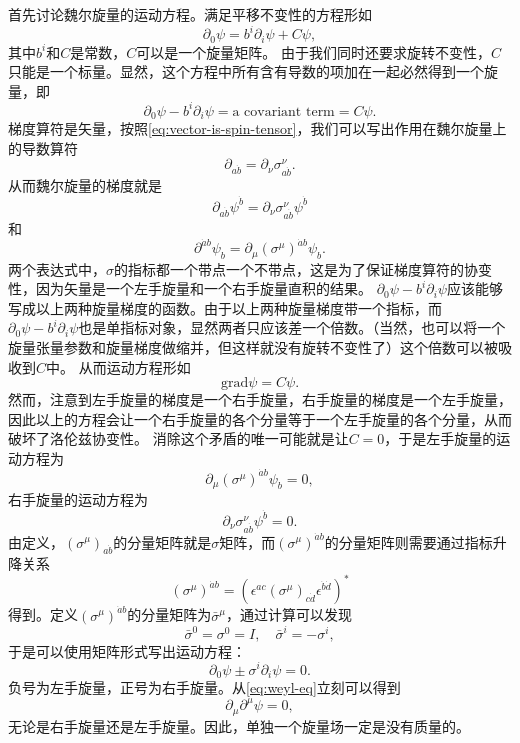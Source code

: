 \documentclass[hyperref, UTF8, a4paper]{ctexart}
\begin{document}
首先讨论魏尔旋量的运动方程。满足平移不变性的方程形如
\[
    \partial_0 \psi = b^i \partial_i \psi + C \psi,
\]
其中$b^i$和$C$是常数，$C$可以是一个旋量矩阵。
由于我们同时还要求旋转不变性，$C$只能是一个标量。显然，这个方程中所有含有导数的项加在一起必然得到一个旋量，即
\[
    \partial_0 \psi - b^i \partial_i \psi = \text{a covariant term} = C \psi.
\]
梯度算符是矢量，按照\eqref{eq:vector-is-spin-tensor}，我们可以写出作用在魏尔旋量上的导数算符
\begin{equation}
    \partial_{a \dot{b}} = \partial_\nu \sigma^\nu_{a \dot{b}}.
\end{equation}
从而魏尔旋量的梯度就是
\[
    \partial_{a \dot{b}} \psi^{\dot{b}} = \partial_\nu \sigma^\nu_{a \dot{b}} \psi^{\dot{b}}
\]
和
\[
    \partial^{\dot{a} b} \psi_b = \partial_\mu (\sigma^\mu)^{\dot{a} b} \psi_b.
\]
两个表达式中，$\sigma$的指标都一个带点一个不带点，这是为了保证梯度算符的协变性，因为矢量是一个左手旋量和一个右手旋量直积的结果。
$\partial_0 \psi - b^i \partial_i \psi$应该能够写成以上两种旋量梯度的函数。由于以上两种旋量梯度带一个指标，而$\partial_0 \psi - b^i \partial_i \psi$也是单指标对象，显然两者只应该差一个倍数。（当然，也可以将一个旋量张量参数和旋量梯度做缩并，但这样就没有旋转不变性了）这个倍数可以被吸收到$C$中。
从而运动方程形如
\[
    \mathrm{grad} \psi = C \psi.
\]
然而，注意到左手旋量的梯度是一个右手旋量，右手旋量的梯度是一个左手旋量，因此以上的方程会让一个右手旋量的各个分量等于一个左手旋量的各个分量，从而破坏了洛伦兹协变性。
消除这个矛盾的唯一可能就是让$C=0$，于是左手旋量的运动方程为
\[
    \partial_\mu (\sigma^\mu)^{\dot{a} b} \psi_b = 0,
\]
右手旋量的运动方程为
\[
    \partial_\nu \sigma^\nu_{a \dot{b}} \psi^{\dot{b}} = 0.
\]
由定义，$(\sigma^\mu)_{a \dot{b}}$的分量矩阵就是$\sigma$矩阵，而$(\sigma^\mu)^{\dot{a} b}$的分量矩阵则需要通过指标升降关系
\[
    (\sigma^\mu)^{\dot{a} b} = (\epsilon^{ac} (\sigma^\mu)_{c \dot{d}} \epsilon^{\dot{b} \dot{d}})^*
\]
得到。定义$(\sigma^\mu)^{\dot{a} b}$的分量矩阵为$\bar{\sigma}^\mu$，通过计算可以发现
\begin{equation}
    \bar{\sigma}^0 = \sigma^0 = I, \quad \bar{\sigma}^i = - \sigma^i,
\end{equation}
于是可以使用矩阵形式写出运动方程：
\begin{equation}
    \partial_0 \psi \pm \sigma^i \partial_i \psi = 0 .
    \label{eq:weyl-eq}
\end{equation}
负号为左手旋量，正号为右手旋量。从\eqref{eq:weyl-eq}立刻可以得到
\[
    \partial_\mu \partial^\mu \psi = 0,
\]
无论是右手旋量还是左手旋量。因此，单独一个旋量场一定是没有质量的。
\end{document}
